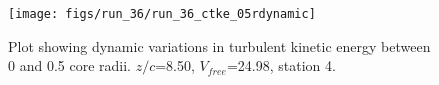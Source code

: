 \begin{figure}[H]
\centering
\texttt{[image: figs/run\_36/run\_36\_ctke\_05rdynamic]}
\caption{Plot showing dynamic variations in turbulent kinetic energy between 0 and 0.5 core radii. $z/c$=8.50, $V_{free}$=24.98, station 4.}
\label{fig:run_36_ctke_05rdynamic}
\end{figure}


